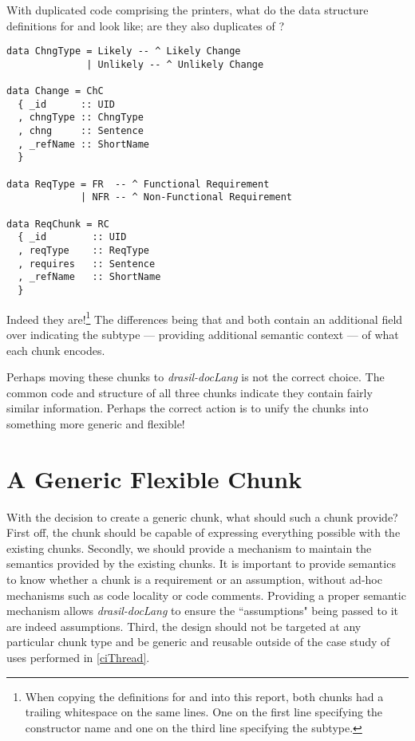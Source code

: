 With duplicated code comprising the printers, what do the data structure definitions for  and  look like; are they also duplicates of ?

\begin{tcolorbox}
\begin{verbatim}
data ChngType = Likely -- ^ Likely Change
              | Unlikely -- ^ Unlikely Change

data Change = ChC
  { _id      :: UID
  , chngType :: ChngType
  , chng     :: Sentence
  , _refName :: ShortName
  }

data ReqType = FR  -- ^ Functional Requirement
             | NFR -- ^ Non-Functional Requirement

data ReqChunk = RC
  { _id        :: UID
  , reqType    :: ReqType
  , requires   :: Sentence
  , _refName   :: ShortName
  }
\end{verbatim}
\end{tcolorbox}

\clearpage
Indeed they are!\footnote{When copying the definitions for  and  into this report, both chunks had a trailing whitespace on the same lines. One on the first line specifying the constructor name and one on the third line specifying the subtype.} The differences being that  and  both contain an additional field over  indicating the subtype --- providing additional semantic context --- of what each chunk encodes.

Perhaps moving these chunks to \textit{drasil-docLang} is not the correct choice. The common code and structure of all three chunks indicate they contain fairly similar information. Perhaps the correct action is to unify the chunks into something more generic and flexible!

\section{A Generic Flexible Chunk}\label{sec:ciDesign}

With the decision to create a generic chunk, what should such a chunk provide? First off, the chunk should be capable of expressing everything possible with the existing chunks. Secondly, we should provide a mechanism to maintain the semantics provided by the existing chunks. It is important to provide semantics to know whether a chunk is a requirement or an assumption, without ad-hoc mechanisms such as code locality or code comments. Providing a proper semantic mechanism allows \textit{drasil-docLang} to ensure the ``assumptions" being passed to it are indeed assumptions. Third, the design should not be targeted at any particular chunk type and be generic and reusable outside of the case study of uses performed in \autoref{ciThread}.

